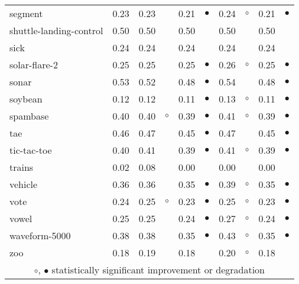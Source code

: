 {\begin{longtable}{lrr@{\hspace{0.1cm}}cr@{\hspace{0.1cm}}cr@{\hspace{0.1cm}}cr@{\hspace{0.1cm}}c}
segment & 0.23 & 0.23 &           & 0.21 & $\bullet$ & 0.24 &   $\circ$ & 0.21 & $\bullet$\\
shuttle-landing-control & 0.50 & 0.50 &           & 0.50 &           & 0.50 &           & 0.50 &          \\
sick & 0.24 & 0.24 &           & 0.24 &           & 0.24 &           & 0.24 &          \\
solar-flare-2 & 0.25 & 0.25 &           & 0.25 & $\bullet$ & 0.26 &   $\circ$ & 0.25 & $\bullet$\\
sonar & 0.53 & 0.52 &           & 0.48 & $\bullet$ & 0.54 &           & 0.48 & $\bullet$\\
soybean & 0.12 & 0.12 &           & 0.11 & $\bullet$ & 0.13 &   $\circ$ & 0.11 & $\bullet$\\
spambase & 0.40 & 0.40 &   $\circ$ & 0.39 & $\bullet$ & 0.41 &   $\circ$ & 0.39 & $\bullet$\\
tae & 0.46 & 0.47 &           & 0.45 & $\bullet$ & 0.47 &           & 0.45 & $\bullet$\\
tic-tac-toe & 0.40 & 0.41 &           & 0.39 & $\bullet$ & 0.41 &   $\circ$ & 0.39 & $\bullet$\\
trains & 0.02 & 0.08 &           & 0.00 &           & 0.00 &           & 0.00 &          \\
vehicle & 0.36 & 0.36 &           & 0.35 & $\bullet$ & 0.39 &   $\circ$ & 0.35 & $\bullet$\\
vote & 0.24 & 0.25 &   $\circ$ & 0.23 & $\bullet$ & 0.25 &   $\circ$ & 0.23 & $\bullet$\\
vowel & 0.25 & 0.25 &           & 0.24 & $\bullet$ & 0.27 &   $\circ$ & 0.24 & $\bullet$\\
waveform-5000 & 0.38 & 0.38 &           & 0.35 & $\bullet$ & 0.43 &   $\circ$ & 0.35 & $\bullet$\\
zoo & 0.18 & 0.19 &           & 0.18 &           & 0.20 &   $\circ$ & 0.18 &          \\
\hline
\multicolumn{10}{c}{$\circ$, $\bullet$ statistically significant improvement or degradation}\\
\end{longtable} \footnotesize \par}